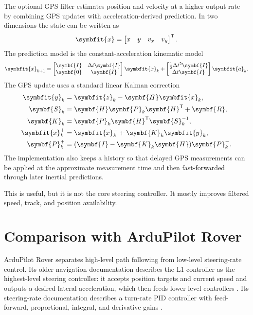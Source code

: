 \documentclass[11pt,twocolumn]{article}
\newcommand{\vct}[1]{\symbfit{#1}}   %
\newcommand{\mat}[1]{\symbf{#1}}     %
\newcommand{\T}{^{\mathsf{T}}}
\newcommand{\inv}{^{-1}}
\begin{document}
The optional GPS filter estimates position and velocity at a higher output rate by
combining GPS updates with acceleration-derived prediction.  In two dimensions the state
can be written as
\begin{equation}
  \vct{x} = \begin{bmatrix} x & y & v_x & v_y \end{bmatrix}\T .
\end{equation}
The prediction model is the constant-acceleration kinematic model
\begin{equation}
  \vct{x}_{k+1} =
  \begin{bmatrix}
  \mat{I} & \Delta t\mat{I} \\
  \mat{0} & \mat{I}
  \end{bmatrix}\vct{x}_k
  +
  \begin{bmatrix}
  \frac{1}{2}\Delta t^2\mat{I} \\
  \Delta t\mat{I}
  \end{bmatrix}\vct{a}_k.
  \label{eq:gps-predict}
\end{equation}
The GPS update uses a standard linear Kalman correction
\begin{align}
  \vct{y}_k &= \vct{z}_k - \mat{H}\vct{x}_k, \\
  \mat{S}_k &= \mat{H}\mat{P}_k\mat{H}\T + \mat{R}, \\
  \mat{K}_k &= \mat{P}_k\mat{H}\T\mat{S}_k\inv, \\
  \vct{x}_k^+ &= \vct{x}_k^- + \mat{K}_k\vct{y}_k, \\
  \mat{P}_k^+ &= (\mat{I}-\mat{K}_k\mat{H})\mat{P}_k^-.
\end{align}
The implementation also keeps a history so that delayed GPS measurements can be applied
at the approximate measurement time and then fast-forwarded through later inertial
predictions.

This is useful, but it is not the core steering controller.  It mostly improves filtered
speed, track, and position availability.

\section{Comparison with ArduPilot Rover}

ArduPilot Rover separates high-level path following from low-level steering-rate control.
Its older navigation documentation describes the L1 controller as the highest-level
steering controller: it accepts position targets and current speed and outputs a desired
lateral acceleration, which then feeds lower-level controllers \cite{ardupilot-l1}.  Its
steering-rate documentation describes a turn-rate PID controller with feed-forward,
proportional, integral, and derivative gains \cite{ardupilot-rate}.
\end{document}
